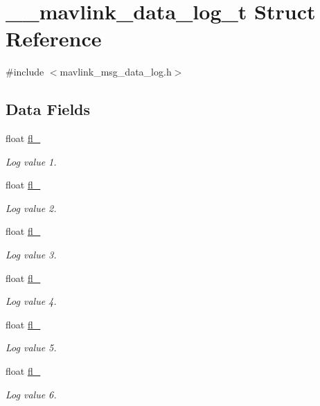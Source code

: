 \hypertarget{struct____mavlink__data__log__t}{\section{\+\_\+\+\_\+mavlink\+\_\+data\+\_\+log\+\_\+t Struct Reference}
\label{struct____mavlink__data__log__t}
}


{\ttfamily \#include $<$mavlink\+\_\+msg\+\_\+data\+\_\+log.\+h$>$}

\subsection*{Data Fields}
\begin{DoxyCompactItemize}
\item 
float \hyperlink{struct____mavlink__data__log__t_a397e166622c053cfbed4bca8b0bb5d36}{fl\+\_}
\begin{DoxyCompactList}\small\item\em Log value 1. \end{DoxyCompactList}\item 
float \hyperlink{struct____mavlink__data__log__t_a40ff76b0549715a8938ca39b82b0b59b}{fl\+\_}
\begin{DoxyCompactList}\small\item\em Log value 2. \end{DoxyCompactList}\item 
float \hyperlink{struct____mavlink__data__log__t_a621ce599540d172aac7e3304ea1f672b}{fl\+\_}
\begin{DoxyCompactList}\small\item\em Log value 3. \end{DoxyCompactList}\item 
float \hyperlink{struct____mavlink__data__log__t_a849f87475c81ba792095d02b373dc2fa}{fl\+\_}
\begin{DoxyCompactList}\small\item\em Log value 4. \end{DoxyCompactList}\item 
float \hyperlink{struct____mavlink__data__log__t_aa2484ed669af31a17a626024b0c6549a}{fl\+\_}
\begin{DoxyCompactList}\small\item\em Log value 5. \end{DoxyCompactList}\item 
float \hyperlink{struct____mavlink__data__log__t_a9febb7a92176a9ae799b64c03a8f7e4e}{fl\+\_}
\begin{DoxyCompactList}\small\item\em Log value 6. \end{DoxyCompactList}\end{DoxyCompactItemize}


